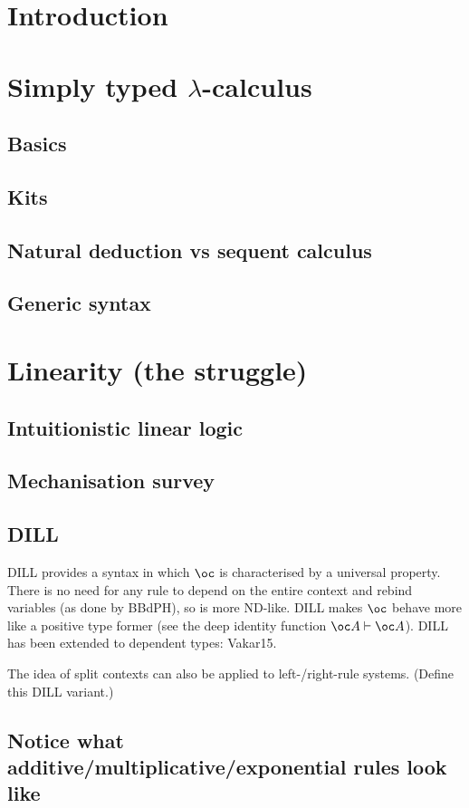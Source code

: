 \documentclass[a4paper,oneside,11pt]{book}
\begin{document}
\chapter{Introduction}

\chapter{Simply typed $\lambda$-calculus}
  \section{Basics}
  \section{Kits}
  \section{Natural deduction vs sequent calculus}
  
  \section{Generic syntax}

\chapter{Linearity (the struggle)}
  \section{Intuitionistic linear logic}
  
  \section{Mechanisation survey}
  \section{DILL}
  DILL provides a syntax in which $\oc$ is characterised by a universal
  property.
  There is no need for any rule to depend on the entire context and rebind
  variables (as done by BBdPH), so is more ND-like.
  DILL makes $\oc$ behave more like a positive type former (see the deep
  identity function $\oc A \vdash \oc A$).
  DILL has been extended to dependent types: Vakar15.

  The idea of split contexts can also be applied to left-/right-rule systems.
  (Define this DILL variant.)

  \section{Notice what additive/multiplicative/exponential rules look like}
\end{document}
